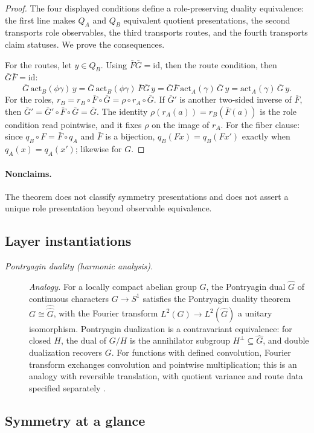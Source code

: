 \begin{proof}
The four displayed conditions define a role-preserving duality equivalence:
the first line makes \(Q_A\) and \(Q_B\) equivalent quotient presentations,
the second transports role observables, the third transports routes, and the
fourth transports claim statuses. We prove the consequences.

For the routes, let \(y\in Q_B\). Using \(\bar F\bar G=\mathrm{id}\),
then the route condition, then \(\bar G\bar F=\mathrm{id}\):
\[
  \bar G\,\mathrm{act}_B(\phi\gamma)\,y
  =\bar G\,\mathrm{act}_B(\phi\gamma)\,\bar F\bar G\,y
  =\bar G\bar F\,\mathrm{act}_A(\gamma)\,\bar G\,y
  =\mathrm{act}_A(\gamma)\,\bar G\,y .
\]
For the roles, \(r_B=r_B\circ\bar F\circ\bar G=\rho\circ r_A\circ\bar G\).
If \(\bar G'\) is another two-sided inverse of \(\bar F\), then \(\bar G'=\bar G'\circ\bar F\circ\bar G=\bar G\). The identity \(\rho(r_A(a))=r_B(\bar F(a))\) is the role condition read pointwise, and it fixes \(\rho\) on the image of \(r_A\).
For the fiber clause: since \(q_B\circ F=\bar F\circ q_A\) and \(\bar F\) is a
bijection, \(q_B(Fx)=q_B(Fx')\) exactly when \(q_A(x)=q_A(x')\); likewise for
\(G\).
\end{proof}

\paragraph{Nonclaims.} The theorem does not classify
symmetry presentations and does not assert a unique role presentation
beyond observable equivalence.

\subsection*{Layer instantiations}\label{layer-inst:F41}

\begingroup\small
\begin{description}
\item[\emph{Pontryagin duality (harmonic analysis).}] \textit{Analogy.}
For a locally compact abelian group \(G\), the Pontryagin dual
\(\widehat G\) of continuous characters \(G\to S^1\) satisfies the
Pontryagin duality theorem
\(G\cong\widehat{\widehat G}\), with the Fourier transform
\(L^2(G)\to L^2(\widehat G)\) a unitary isomorphism.  Pontryagin dualization is a contravariant equivalence: for closed \(H\), the
dual of \(G/H\) is the annihilator subgroup \(H^\perp\subseteq\widehat G\), and
double dualization recovers \(G\). For functions with defined convolution,
Fourier transform exchanges convolution and pointwise multiplication; this is
an analogy with reversible translation, with quotient variance and route data
specified separately \citep{Pontryagin1966TopologicalGroups}.

\end{description}
\endgroup


\subsection*{Symmetry at a glance}\label{sec:symmetry:summary}

\FloatBarrier
